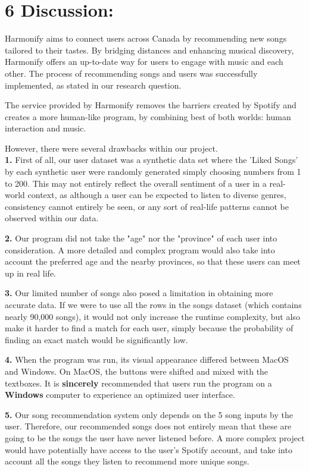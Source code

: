 \documentclass[fontsize=11pt]{article}
\numberwithin{equation}{section}
\theoremstyle{plain} %
\theoremstyle{definition}
\theoremstyle{remark}
\begin{document}
\section*{6 Discussion:} 
Harmonify aims to connect users across Canada by recommending new songs tailored to their tastes. By bridging distances and enhancing musical discovery, Harmonify offers an up-to-date way for users to engage with music and each other. The process of recommending songs and users was successfully implemented, as stated in our research question. 

The service provided by Harmonify removes the barriers created by Spotify and creates a more human-like program, by combining best of both worlds: human interaction and music. 

However, there were several drawbacks within our project.
\\

\textbf{1.} First of all, our user dataset was a synthetic data set where the 'Liked Songs' by each synthetic user were randomly generated simply choosing numbers from 1 to 200. This may not entirely reflect the overall sentiment of a user in a real-world context, as although a user can be expected to listen to diverse genres, consistency cannot entirely be seen, or any sort of real-life patterns cannot be observed within our data. 

\textbf{2.} Our program did not take the "age" nor the "province" of each user into consideration. A more detailed and complex program would also take into account the preferred age and the nearby provinces, so that these users can meet up in real life. 

\textbf{3.} Our limited number of songs also posed a limitation in obtaining more accurate data. If we were to use all the rows in the songs dataset (which contains nearly 90,000 songs), it would not only increase the runtime complexity, but also make it harder to find a match for each user, simply because the probability of finding an exact match would be significantly low.

\textbf{4.} When the program was run, its visual appearance differed between MacOS and Windows. On MacOS, the buttons were shifted and mixed with the textboxes. It is \textbf{sincerely} recommended that users run the program on a \textbf{Windows} computer to experience an optimized user interface. 

\textbf{5.} Our song recommendation system only depends on the 5 song inputs by the user. Therefore, our recommended songs does not entirely mean that these are going to be the songs the user have never listened before. A more complex project would have potentially have access to the user's Spotify account, and take into account all the songs they listen to recommend more unique songs.
\end{document}
